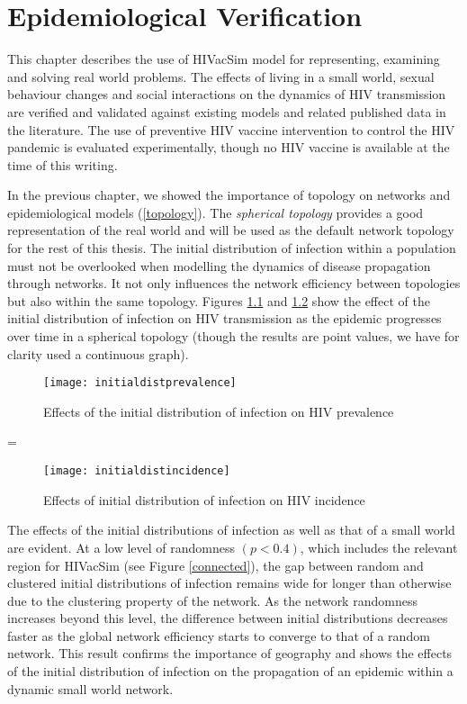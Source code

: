 \chapter{Epidemiological Verification}\label{chpvalidate}

\parskip=15pt
This chapter describes the use of HIVacSim model for representing, examining and solving
real world problems. The effects of living in a small world, sexual behaviour changes and
social interactions on the dynamics of HIV transmission are verified and validated
against existing models and related published data in the literature. The use of
preventive HIV vaccine intervention to control the HIV pandemic is evaluated
experimentally, though no HIV vaccine is available at the time of this writing.

In the previous chapter, we showed the importance of topology on networks and
epidemiological models (\ref{topology}). The \emph{spherical topology} provides a good
representation of the real world and will be used as the default network topology for the
rest of this thesis. The initial distribution of infection within a population must not
be overlooked when modelling the dynamics of disease propagation through networks. It not
only influences the network efficiency between topologies but also within the same
topology. Figures \ref{initdistprevalence} and \ref{initdistincidence} show the effect of
the initial distribution of infection on HIV transmission as the epidemic progresses over
time in a spherical topology (though the results are point values, we have for clarity
used a continuous graph).
\begin{figure}[h]
\texttt{[image: initialdistprevalence]}
\caption{Effects of the initial distribution of infection on HIV prevalence}
\label{initdistprevalence}
\end{figure}
\parskip=\baselineskip

\begin{figure}[ht]
\texttt{[image: initialdistincidence]}
\caption{Effects of initial distribution of infection on HIV incidence}
\label{initdistincidence}
\end{figure}

The effects of the initial distributions of infection as well as that of a small world
are evident. At a low level of randomness $(p < 0.4)$, which includes the relevant region
for HIVacSim (see Figure \ref{connected}), the gap between random and clustered initial
distributions of infection remains wide for longer than otherwise due to the clustering
property of the network. As the network randomness increases beyond this level, the
difference between initial distributions decreases faster as the global network
efficiency starts to converge to that of a random network. This result confirms the
importance of geography and shows the effects of the initial distribution of infection on
the propagation of an epidemic within a dynamic small world network.


